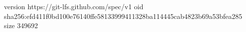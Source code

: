 version https://git-lfs.github.com/spec/v1
oid sha256:efd411f0bd100e76140ffe58133999411328ba114445cab4823b69a53bfea285
size 349692

